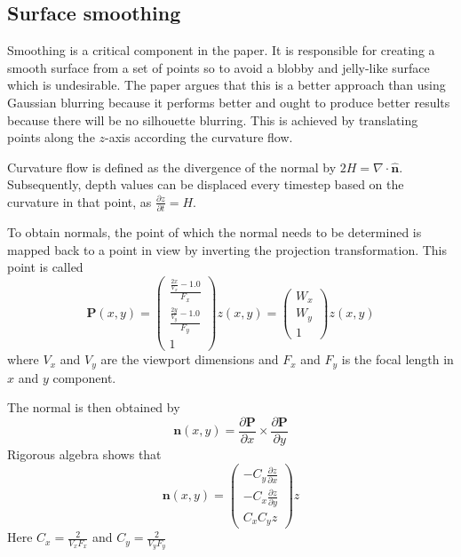 \subsection{Surface smoothing}
\label{sec:smoothing}
Smoothing is a critical component in the paper. It is responsible for creating a smooth surface from a set of points so to avoid a blobby and jelly-like surface which is undesirable. The paper argues that this is a better approach than using Gaussian blurring because it performs better and ought to produce better results because there will be no silhouette blurring. 
This is achieved by translating points along the $z$-axis according the curvature flow. 

Curvature flow is defined as the divergence of the normal by \(2H = \nabla \cdot \hat{\mathbf{n}}\). Subsequently, depth values can be displaced every timestep based on the curvature in that point, as \(\frac{\partial z}{\partial t} = H\).

To obtain normals, the point of which the normal needs to be determined is mapped back to a point in view by inverting the projection transformation. This point is called \begin{equation}
	\label{eq:pcalc}
	\mathbf{P}(x, y) = \begin{pmatrix}\frac{\frac{2x}{V_x} - 1.0}{F_x}\\\frac{\frac{2y}{V_y} - 1.0}{F_y}\\1\end{pmatrix}z(x,y) = \begin{pmatrix}W_x\\W_y\\1\end{pmatrix}z(x,y)
\end{equation}
where \(V_x\) and \(V_y\) are the viewport dimensions and \(F_x\) and \(F_y\) is the focal length in \(x\) and \(y\) component.

The normal is then obtained by 
\begin{equation}
	\label{eq:norm}
	\mathbf{n}(x,y) = \frac{\partial \mathbf{P}}{\partial x} \times \frac{\partial \mathbf{P}}{\partial y}
\end{equation}
Rigorous algebra shows that 
\begin{equation}
	\label{eq:normals}
	\mathbf{n}(x,y) = \begin{pmatrix}-C_y\frac{\partial z}{\partial x}\\-C_x\frac{\partial z}{\partial y}\\C_xC_yz\end{pmatrix}z
\end{equation}
Here \(C_x = \frac{2}{V_xF_x}\) and \(C_y = \frac{2}{V_yF_y}\) 

